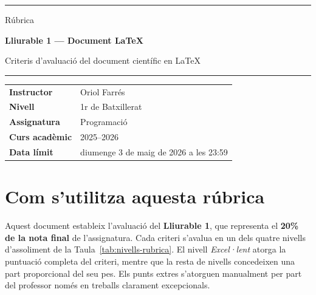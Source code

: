 \documentclass[12pt,a4paper]{article}
\newcommand{\InstructorName}{Oriol Farrés}
\newcommand{\CourseLevel}{1r de Batxillerat}
\newcommand{\AcademicYear}{2025--2026}
\begin{document}
\hypersetup{pageanchor=false}
\begin{titlepage}
  \thispagestyle{empty}
  \color{upcblue}
  \rule{\textwidth}{1.2pt}
  \color{black}

  \vspace{1.2cm}

  \begin{center}
    {\Large Rúbrica\par}
    \vspace{0.3cm}
    {\Huge\bfseries Lliurable 1 --- Document LaTeX\par}
    \vspace{0.35cm}
    {\large Criteris d'avaluació del document científic en LaTeX\par}
  \end{center}

  \vspace{0.6cm}

  \color{upcblue}
  \rule{\textwidth}{0.6pt}
  \color{black}

  \vspace{1.6cm}

  \begin{center}
    \begin{tabular}{>{\bfseries}p{4.2cm}p{9.2cm}}
      Instructor & \InstructorName \\
      Nivell & \CourseLevel \\
      Assignatura & Programació \\
      Curs acadèmic & \AcademicYear \\
      Data límit & diumenge 3 de maig de 2026 a les 23:59 \\
    \end{tabular}
  \end{center}

  \vfill

  \begin{center}
  \end{center}
\end{titlepage}
\hypersetup{pageanchor=true}

\section{Com s'utilitza aquesta rúbrica}

Aquest document estableix l'avaluació del \textbf{Lliurable 1}, que representa el \textbf{20\% de la nota final} de l'assignatura. Cada criteri s'avalua en un dels quatre nivells d'assoliment de la Taula~\ref{tab:nivells-rubrica}. El nivell \emph{Excel·lent} atorga la puntuació completa del criteri, mentre que la resta de nivells concedeixen una part proporcional del seu pes. Els punts extres s'atorguen manualment per part del professor només en treballs clarament excepcionals.
\end{document}
